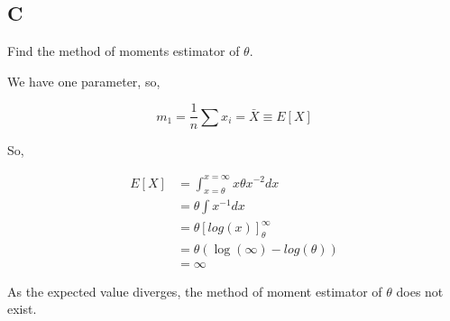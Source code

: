 \subsection*{C}

Find the method of moments estimator of $\theta$.

We have one parameter, so,

\[m_1 = \frac{1}{n} \sum x_i = \bar{X} \equiv E[X] \]

So,

\begin{align*}
	E[X] &= \int_{x=\theta}^{x=\infty} x \theta x^{-2} dx \\
	&= \theta \int x^{-1} dx \\
	&= \theta \left[ log(x) \right]_{\theta}^{\infty} \\
	&= \theta \left( \log(\infty) - log(\theta) \right) \\
	&= \infty
\end{align*}

As the expected value diverges, the method of moment estimator of $\theta$ does not exist.
